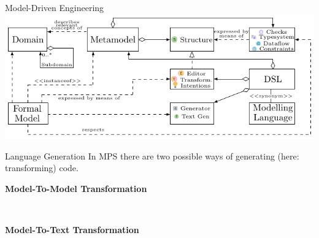 	\begin{frame}[noframenumbering]{Model-Driven Engineering}
		\includegraphics[width=\textwidth]{tikz/mdsd_concept_8.pdf}
	\end{frame}
	
	\begin{frame}{Language Generation}
		In MPS there are two possible ways of generating (here: transforming) code.\\
		
		\begin{minipage}{0.4\textwidth}
			\textbf{Model-To-Model Transformation}
		\end{minipage} 
		\begin{minipage}{0.09\textwidth}
			\Large
			\textcolor{white}{$\Rightarrow$}
		\end{minipage}
		\begin{minipage}{0.4\textwidth}
			\textbf{Model-To-Text Transformation}
		\end{minipage}
	
		\vspace*{0.5cm}
		\pause
		

\end{frame}
